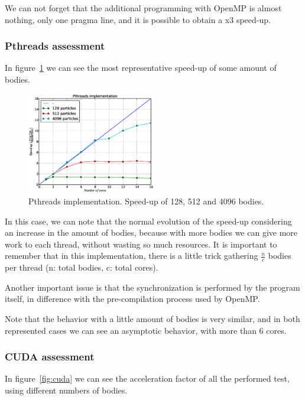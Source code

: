 We can not forget that the additional programming with OpenMP
is almost nothing, only one pragma line, and it is possible to obtain
a x3 speed-up.

\subsubsection{Pthreads assessment}

In figure~\ref{fig:pthread} we can see the most representative speed-up of some
amount of bodies.

\begin{figure}[h!t]
    \centering
    \includegraphics[width=0.5\textwidth]{images/pthreads.eps}
    \caption{Pthreads implementation. Speed-up of 128, 512 and 4096 bodies.}
    \label{fig:pthread}
\end{figure}

In this case, we can note that the normal evolution of the speed-up
considering an increase in the amount of bodies, because with more bodies
we can give more work to each thread, without wasting so much resources.
It is important to remember that in this implementation, there is a little trick
gathering $\frac{n}{c}$ bodies per thread (n: total bodies, c: total cores).

Another important issue is that the synchronization is performed by the program
itself, in difference with the pre-compilation process used by OpenMP.

Note that the behavior with a little amount of bodies is very similar,
and in both represented cases we can see an asymptotic behavior,
with more than 6 cores.

\subsubsection{CUDA assessment}

In figure~\ref{fig:cuda} we can see the acceleration factor of all
the performed test, using different numbers of bodies.

